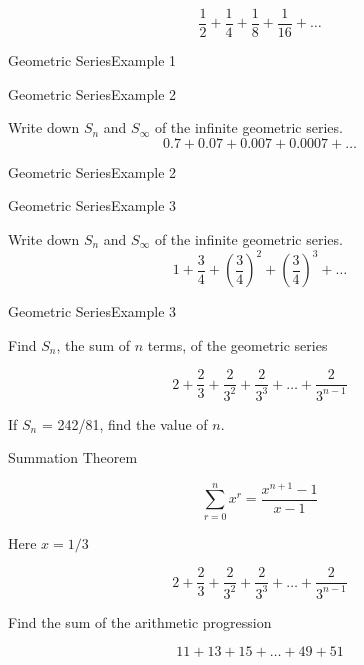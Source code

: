 \[ \frac{1}{2} + \frac{1}{4} + \frac{1}{8} +  \frac{1}{16} +\ldots  \]




{Geometric Series}{Example 1}




{Geometric Series}{Example 2}

Write down $S_n$ and $S_{\infty}$ of the infinite geometric series.
\[ 0.7 + 0.07 + 0.007 + 0.0007 + \ldots  \]


{Geometric Series}{Example 2}



{Geometric Series}{Example 3}

Write down $S_n$ and $S_{\infty}$ of the infinite geometric series.
\[ 1 + \frac{3}{4} + \left( \frac{3}{4} \right)^2 + \left( \frac{3}{4} \right)^3 + \ldots  \]



{Geometric Series}{Example 3}






Find $S_n$, the sum of $n$ terms, of the geometric series

\[  2 + \frac{2}{3} + \frac{2}{3^2} + \frac{2}{3^3} +  \ldots + \frac{2}{3^{n-1}} \]

If $S_n$ = 242/81, find the value of $n$.




Summation Theorem

\[ \sum^{n}_{r=0} x^r = \frac{x^{n+1}-1}{x-1} \]

Here $x = 1/3$

\[  2 + \frac{2}{3} + \frac{2}{3^2} + \frac{2}{3^3} +  \ldots + \frac{2}{3^{n-1}} \]








Find the sum of the arithmetic progression
{

\[ 11 + 13 + 15 + \dots + 49 + 51 \]
}

